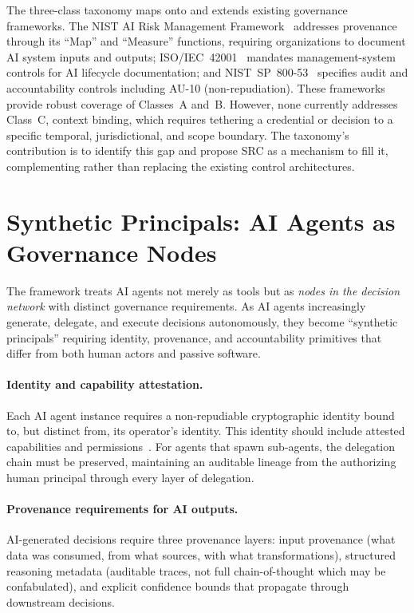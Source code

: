 \documentclass[runningheads]{llncs}
\begin{document}
The three-class taxonomy maps onto and extends existing governance frameworks. The NIST AI Risk Management Framework~\cite{nist2023airm,nist2024genai} addresses provenance through its ``Map'' and ``Measure'' functions, requiring organizations to document AI system inputs and outputs; ISO/IEC~42001~\cite{iso42001} mandates management-system controls for AI lifecycle documentation; and NIST~SP~800-53~\cite{nist2020sp800} specifies audit and accountability controls including AU-10 (non-repudiation). These frameworks provide robust coverage of Classes~A and~B. However, none currently addresses Class~C, context binding, which requires tethering a credential or decision to a specific temporal, jurisdictional, and scope boundary. The taxonomy's contribution is to identify this gap and propose SRC as a mechanism to fill it, complementing rather than replacing the existing control architectures.


\section{Synthetic Principals: AI Agents as Governance Nodes}
\label{sec:synthetic}

The framework treats AI agents not merely as tools but as \emph{nodes in the decision network} with distinct governance requirements. As AI agents increasingly generate, delegate, and execute decisions autonomously, they become ``synthetic principals'' requiring identity, provenance, and accountability primitives that differ from both human actors and passive software.

\paragraph{Identity and capability attestation.}
Each AI agent instance requires a non-repudiable cryptographic identity bound to, but distinct from, its operator's identity. This identity should include attested capabilities and permissions~\cite{narvaneni2025agent}. For agents that spawn sub-agents, the delegation chain must be preserved, maintaining an auditable lineage from the authorizing human principal through every layer of delegation.

\paragraph{Provenance requirements for AI outputs.}
AI-generated decisions require three provenance layers: input provenance (what data was consumed, from what sources, with what transformations), structured reasoning metadata (auditable traces, not full chain-of-thought which may be confabulated), and explicit confidence bounds that propagate through downstream decisions.
\end{document}
